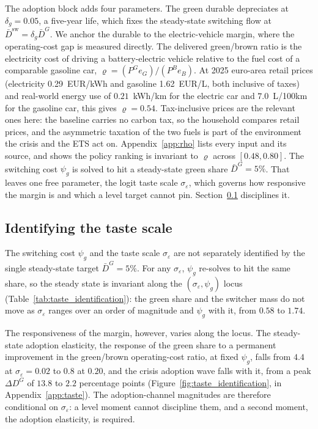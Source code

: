 The adoption block adds four parameters. The green durable depreciates at
$\delta_g=0.05$, a five-year life, which fixes the steady-state switching flow at
$\bar D^{\mathrm{sw}}=\delta_g\bar D^G$. We anchor the durable to the electric-vehicle
margin, where the operating-cost gap is measured directly. The delivered green/brown
ratio is the electricity cost of driving a battery-electric vehicle relative to the
fuel cost of a comparable gasoline car, $\varrho=(P^G e_G)/(P^B e_B)$. At 2025
euro-area retail prices (electricity \mbox{0.29 EUR/kWh} and gasoline
\mbox{1.62 EUR/L}, both inclusive of taxes) and real-world energy use of
$0.21$~kWh/km for the electric car and $7.0$~L/100km for the gasoline car, this gives
$\varrho=0.54$. Tax-inclusive prices are the relevant ones here: the baseline carries
no carbon tax, so the household compares retail prices, and the asymmetric taxation of
the two fuels is part of the environment the crisis and the ETS act on.
Appendix~\ref{app:rho} lists every input and its source, and
shows the policy ranking is invariant to $\varrho$ across $[0.48,0.80]$. The switching
cost $\psi_g$ is solved to hit a steady-state green share $\bar D^G=5\%$. That leaves one free
parameter, the logit taste scale $\sigma_\varepsilon$, which governs how responsive
the margin is and which a level target cannot pin. Section~\ref{sec:taste_id}
disciplines it.

\subsection{Identifying the taste scale}\label{sec:taste_id}

The switching cost $\psi_g$ and the taste scale $\sigma_\varepsilon$ are not
separately identified by the single steady-state target $\bar D^G=5\%$. For any
$\sigma_\varepsilon$, $\psi_g$ re-solves to hit the same share, so the steady state is
invariant along the $(\sigma_\varepsilon,\psi_g)$ locus
(Table~\ref{tab:taste_identification}): the green share and the switcher mass do not move as
$\sigma_\varepsilon$ ranges over an order of magnitude and $\psi_g$ with it, from
$0.58$ to $1.74$.

The responsiveness of the margin, however, varies along the locus. The
steady-state adoption elasticity, the response of the green share to a permanent
improvement in the green/brown operating-cost ratio, at fixed $\psi_g$, falls from
$4.4$ at $\sigma_\varepsilon=0.02$ to $0.8$ at $0.20$, and the crisis adoption wave
falls with it, from a peak $\Delta D^G$ of $13.8$ to $2.2$ percentage points
(Figure~\ref{fig:taste_identification}, in Appendix~\ref{app:taste}). The adoption-channel magnitudes are therefore conditional
on $\sigma_\varepsilon$: a level moment cannot discipline them, and a second
moment, the adoption elasticity, is required.


